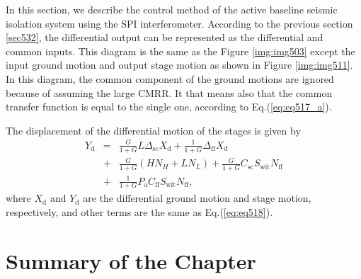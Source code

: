 In this section, we describe the control method of the active baseline seismic isolation system using the SPI interferometer. According to the previous section \cref{sec532}, the differential output can be represented as the differential and common inputs. This diagram is the same as the Figure \ref{img:img503} except the input ground motion and output stage motion as shown in Figure \ref{img:img511}. In this diagram, the common component of the ground motions are ignored because of assuming the large CMRR. It that means also that the common transfer function is equal to the single one, according to Eq.(\ref{eq:eq517_a}).

The displacement of the differential motion of the stages is given by 
\begin{eqnarray}\nonumber
  Y_{\mathrm{d}} &=&\frac{G}{1+G}L\Delta_{\mathrm{sc}} X_{\mathrm{d}} + \frac{1}{1+G} \Delta_{\mathrm{ff}} X_{\mathrm{d}}\\ \nonumber
  &+& \frac{G}{1+G}\left(HN_{H}+LN_{L}\right) + \frac{G}{1+G}C_{\mathrm{sc}}S_{\mathrm{wit}}N_{\mathrm{ff}} \\ 
  &+& \frac{1}{1+G}P_{\mathrm{a}} C_{\mathrm{ff}}S_{\mathrm{wit}}N_{\mathrm{ff}} \label{eq:eq520},
\end{eqnarray}
where $X_{\mathrm{d}}$ and $Y_{\mathrm{d}}$ are the differential ground motion and stage motion, respectively, and other terms are the same as Eq.(\ref{eq:eq518}).




\section{Summary of the Chapter}

